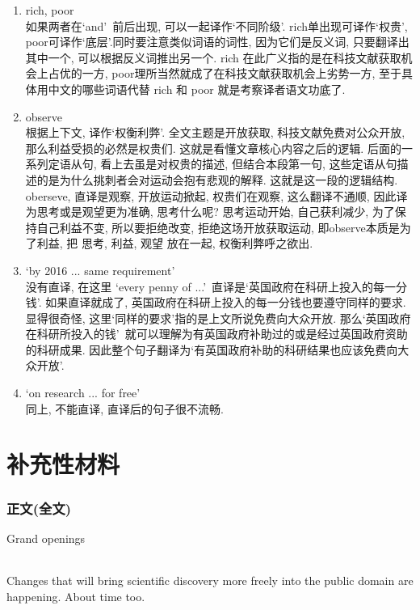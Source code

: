 \documentclass[a4paper, 12pt, UTF8]{article}
\begin{document}
\begin{enumerate}[\hspace{0.5cm} 1.]
    \item rich, poor\\
          如果两者在\lq and\rq\ 前后出现, 可以一起译作\lq 不同阶级\rq. rich单出现可译作\lq 权贵\rq, poor可译作\lq 底层\rq.同时要注意类似词语的词性, 因为它们是反义词, 只要翻译出其中一个, 可以根据反义词推出另一个. rich 在此广义指的是在科技文献获取机会上占优的一方, poor理所当然就成了在科技文献获取机会上劣势一方, 至于具体用中文的哪些词语代替 rich 和 poor 就是考察译者语文功底了.
    \item observe\\
          根据上下文, 译作\lq 权衡利弊\rq. 全文主题是开放获取, 科技文献免费对公众开放, 那么利益受损的必然是权贵们. 这就是看懂文章核心内容之后的逻辑. 后面的一系列定语从句, 看上去虽是对权贵的描述, 但结合本段第一句, 这些定语从句描述的是为什么挑刺者会对运动会抱有悲观的解释. 这就是这一段的逻辑结构. oberseve, 直译是观察, 开放运动掀起, 权贵们在观察, 这么翻译不通顺, 因此译为思考或是观望更为准确, 思考什么呢? 思考运动开始, 自己获利减少, 为了保持自己利益不变, 所以要拒绝改变, 拒绝这场开放获取运动, 即observe本质是为了利益, 把 思考, 利益, 观望 放在一起, 权衡利弊呼之欲出.
    \item \lq by 2016 ... same requirement\rq \\
          没有直译, 在这里 \lq every penny of ...\rq\ 直译是\lq 英国政府在科研上投入的每一分钱\rq. 如果直译就成了, 英国政府在科研上投入的每一分钱也要遵守同样的要求. 显得很奇怪, 这里\lq 同样的要求\rq 指的是上文所说免费向大众开放. 那么\lq 英国政府在科研所投入的钱\rq\ 就可以理解为有英国政府补助过的或是经过英国政府资助的科研成果. 因此整个句子翻译为\lq 有英国政府补助的科研结果也应该免费向大众开放\rq. 
    \item \lq on research ... for free\rq \\
          同上, 不能直译, 直译后的句子很不流畅.
\end{enumerate}

\newpage
\part{补充性材料}

\newpage
\section{正文(全文)}
\begin{bfseries}
    \Large
    Grand openings
    \paragraph*{}
    \large
    Changes that will bring scientific discovery more freely into the public domain are happening. About time too.
\end{bfseries}
\end{document}
